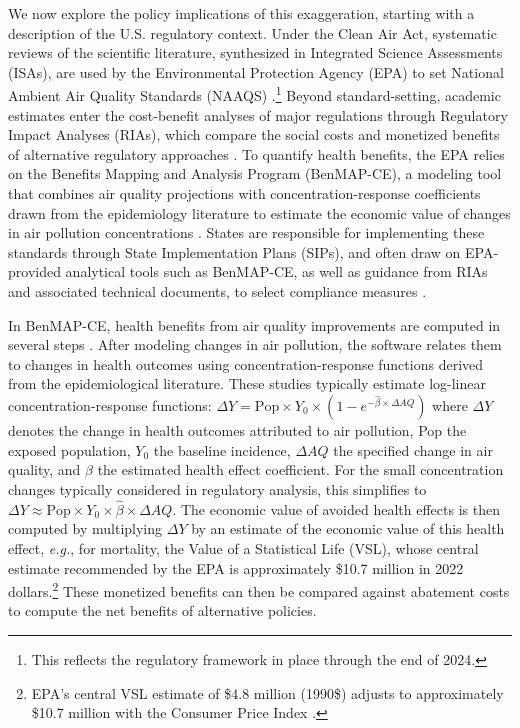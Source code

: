 \documentclass[12pt]{article}
\begin{document}
		We now explore the policy implications of this exaggeration, starting with a description of the U.S. regulatory context. Under the Clean Air Act, systematic reviews of the scientific literature, synthesized in Integrated Science Assessments (ISAs), are used by the Environmental Protection Agency (EPA) to set National Ambient Air Quality Standards (NAAQS) \citep{u.s.epa_preamble_2015}.\footnote{This reflects the regulatory framework in place through the end of 2024.} Beyond standard-setting, academic estimates enter the cost-benefit analyses of major regulations through Regulatory Impact Analyses (RIAs), which compare the social costs and monetized benefits of alternative regulatory approaches \citep{u.s.epa_final_2024}. To quantify health benefits, the EPA relies on the Benefits Mapping and Analysis Program (BenMAP-CE), a modeling tool that combines air quality projections with concentration-response coefficients drawn from the epidemiology literature to estimate the economic value of changes in air pollution concentrations \citep{sacks_environmental_2018}. States are responsible for implementing these standards through State Implementation Plans (SIPs), and often draw on EPA-provided analytical tools such as BenMAP-CE, as well as guidance from RIAs and associated technical documents, to select compliance measures \citep{u.s.epa_environmental_2023}.
		
		In BenMAP-CE, health benefits from air quality improvements are computed in several steps \citep{sacks_environmental_2018}. After modeling changes in air pollution, the software relates them to changes in health outcomes using concentration-response functions derived from the epidemiological literature. These studies typically estimate log-linear concentration-response functions: $\Delta Y = \text{Pop} \times Y_0 \times (1 - e^{-\hat{\beta} \times \Delta AQ})$ where $\Delta Y$ denotes the change in health outcomes attributed to air pollution, Pop the exposed population, $Y_0$ the baseline incidence, $\Delta AQ$ the specified change in air quality, and $\hat{\beta}$ the estimated health effect coefficient. For the small concentration changes typically considered in regulatory analysis, this simplifies to $\Delta Y \approx \text{Pop} \times Y_0 \times \hat{\beta} \times \Delta AQ$. The economic value of avoided health effects is then computed by multiplying $\Delta Y$ by an estimate of the economic value of this health effect, \textit{e.g.}, for mortality, the Value of a Statistical Life (VSL), whose central estimate recommended by the EPA is approximately \$10.7 million in 2022 dollars.\footnote{EPA's central VSL estimate of \$4.8 million (1990\$) adjusts to approximately \$10.7 million with the Consumer Price Index \citep{u.s.epa_guidelines_2024}.} These monetized benefits can then be compared against abatement costs to compute the net benefits of alternative policies. 
\end{document}
